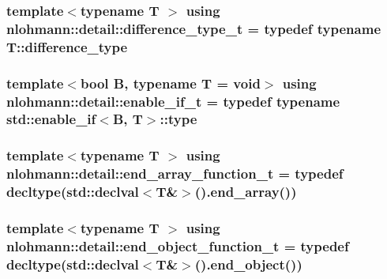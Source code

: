 \subsubsection[{\texorpdfstring{difference\+\_\+type\+\_\+t}{difference_type_t}}]{\setlength{\rightskip}{0pt plus 5cm}template$<$typename T $>$ using {\bf nlohmann\+::detail\+::difference\+\_\+type\+\_\+t} = typedef typename T\+::difference\+\_\+type}\hypertarget{namespacenlohmann_1_1detail_a3603b59a17d1c5e15050743b847992f2}{}\label{namespacenlohmann_1_1detail_a3603b59a17d1c5e15050743b847992f2}
\subsubsection[{\texorpdfstring{enable\+\_\+if\+\_\+t}{enable_if_t}}]{\setlength{\rightskip}{0pt plus 5cm}template$<$bool B, typename T  = void$>$ using {\bf nlohmann\+::detail\+::enable\+\_\+if\+\_\+t} = typedef typename std\+::enable\+\_\+if$<$B, T$>$\+::type}\hypertarget{namespacenlohmann_1_1detail_a02bcbc878bee413f25b985ada771aa9c}{}\label{namespacenlohmann_1_1detail_a02bcbc878bee413f25b985ada771aa9c}
\subsubsection[{\texorpdfstring{end\+\_\+array\+\_\+function\+\_\+t}{end_array_function_t}}]{\setlength{\rightskip}{0pt plus 5cm}template$<$typename T $>$ using {\bf nlohmann\+::detail\+::end\+\_\+array\+\_\+function\+\_\+t} = typedef decltype(std\+::declval$<$T\&$>$().end\+\_\+array())}\hypertarget{namespacenlohmann_1_1detail_aec53c029383b34a72182210e58fadb79}{}\label{namespacenlohmann_1_1detail_aec53c029383b34a72182210e58fadb79}
\subsubsection[{\texorpdfstring{end\+\_\+object\+\_\+function\+\_\+t}{end_object_function_t}}]{\setlength{\rightskip}{0pt plus 5cm}template$<$typename T $>$ using {\bf nlohmann\+::detail\+::end\+\_\+object\+\_\+function\+\_\+t} = typedef decltype(std\+::declval$<$T\&$>$().end\+\_\+object())}\hypertarget{namespacenlohmann_1_1detail_af52d6d2521c386998ae940d118182ebc}{}\label{namespacenlohmann_1_1detail_af52d6d2521c386998ae940d118182ebc}
